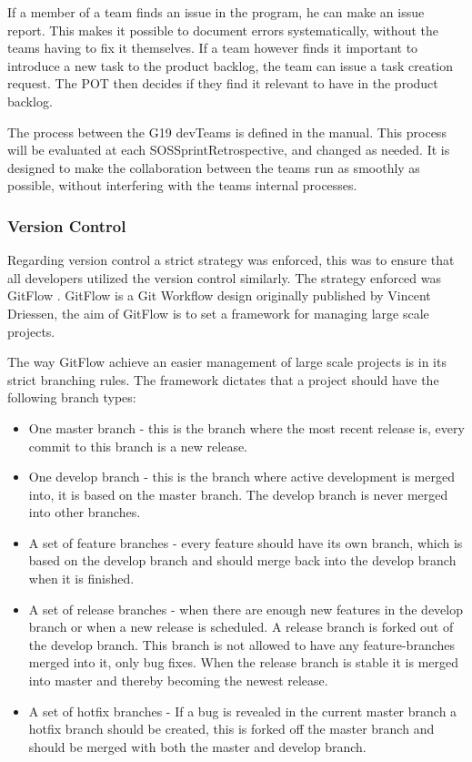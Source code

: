 If a member of a team finds an issue in the program, he can make an issue report. This makes it possible to document errors systematically, without the \glspl{team} having to fix it themselves. If a \gls{team} however finds it important to introduce a new task to the product backlog, the team can issue a task creation request. The \gls{POT} then decides if they find it relevant to have in the product backlog.

The process between the \gls{G19} \glspl{devTeam} is defined in the manual. This process will be evaluated at each \gls{SOSSprintRetrospective}, and changed as needed. It is designed to make the collaboration between the \glspl{team} run as smoothly as possible, without interfering with the \glspl{team} internal processes.

\subsubsection{Version Control}
Regarding version control a strict strategy was enforced, this was to ensure that all developers utilized the version control similarly. The strategy enforced was GitFlow \cite{GitFlow}. GitFlow is a Git Workflow design originally published by Vincent Driessen, the aim of GitFlow is to set a framework for managing large scale projects.

The way GitFlow achieve an easier management of large scale projects is in its strict branching rules. The framework dictates that a project should have the following branch types\cite{GitFlow}:

\begin{itemize}
    \item One master branch - this is the branch where the most recent release is, every commit to this branch is a new release.
    \item One develop branch - this is the branch where active development is merged into, it is based on the master branch. The develop branch is never merged into other branches.
    \item A set of feature branches - every feature should have its own branch, which is based on the develop branch and should merge back into the develop branch when it is finished.
    \item A set of release branches - when there are enough new features in the develop branch or when a new release is scheduled. A release branch is forked out of the develop branch. This branch is not allowed to have any feature-branches merged into it, only bug fixes. When the release branch is stable it is merged into master and thereby becoming the newest release.
    \item A set of hotfix branches - If a bug is revealed in the current master branch a hotfix branch should be created, this is forked off the master branch and should be merged with both the master and develop branch.
\end{itemize}

